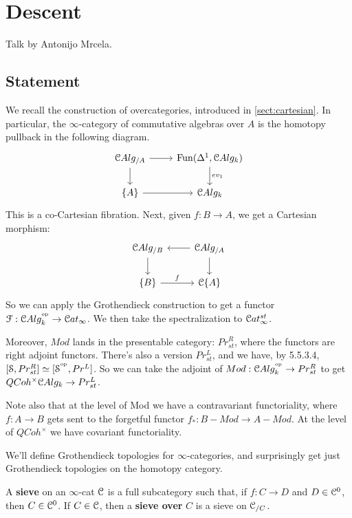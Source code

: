 \chapter{Descent}
Talk by Antonijo Mrcela.

\section{Statement}
\label{sect:cc_statement}

We recall the construction of overcategories, introduced in \ref{sect:cartesian}. In particular, the $\infty$-category of
commutative algebras over $A$ is the homotopy pullback in the following diagram.
\[
\begin{tikzcd}
\cC Alg_{/A} \arrow{r}\arrow{d} & \Fun(\Delta^1 , \cC Alg_k)\arrow{d}{ev_1} \\
\{A\} \arrow{r} & \cC Alg_k
\end{tikzcd}
\]
This is a co-Cartesian fibration. Next, given $f:B \to A$, we get a Cartesian morphism:
\[
\begin{tikzcd}
\cC Alg_{/B} \arrow{d} &  \cC Alg_{/A} \arrow{d}\arrow{l}\\
\{B\} \arrow{r}{f} & \cC \{A\}
\end{tikzcd}
\]
So we can apply the Grothendieck construction to get a functor $\mathcal{F} : \mathcal C Alg_k^{^\mathrm{op}}
\to \mathcal C at_{\infty}$. We then take the spectralization to $\mathcal C at_{\infty}^{st}$.

Moreover, $Mod$ lands in the presentable category: $Pr_{st}^R$, where the functors are right adjoint functors. There's also a version
$Pr_{st}^L$, and we have, by \cite{HTT} 5.5.3.4, $[\mathcal S, Pr_{st}^R] \simeq [\mathcal S^{^\mathrm{op}}, Pr^L]$. So we can take the adjoint of
$Mod: \mathcal C Alg_k^{^\mathrm{op}} \to Pr_{st}^R$ to get $QCoh^{\times} \mathcal C Alg_k \to Pr_{st}^L$.

Note also that at the level of Mod we have a contravariant functoriality, where $f: A \to B$ gets sent to the forgetful functor
$f_* : B-Mod \to A-Mod$. At the level of $QCoh^{\times}$ we have covariant functoriality.

We'll define Grothendieck topologies for $\infty$-categories, and surprisingly get just Grothendieck topologies on the homotopy
category.

\begin{defin}
A \textbf{sieve} on an $\infty$-cat $\mathcal C$ is a full subcategory such that, if $f: C \to D$ and $D \in \mathcal C^0$, then
$C \in \mathcal C^0$. If $C \in \mathcal C$, then a \textbf{sieve over} $C$ is a sieve on $\mathcal C_{/C}$.
\end{defin}

